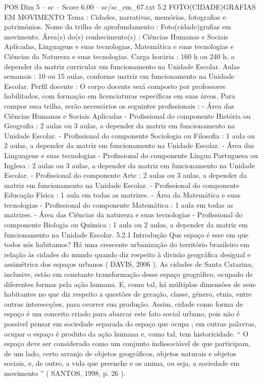 \begin{textsample}{POS Dim 5 – sc – Score 6.00 – sc/sc\_em\_67.txt}  \label{ex:f5_pos_035}
5.2 FOTO(CIDADE)GRAFIAS EM MOVIMENTO Tema : Cidades, narrativas, memórias, fotografias e patrimônios.
Nome da trilha de aprofundamento : Foto(cidade)grafias em movimento.
Área(s) do(s) conhecimento(s) : Ciências Humanas e Sociais Aplicadas, Linguagens e suas tecnologias, Matemática e suas tecnologias e Ciências da Natureza e suas tecnologias.
Carga horária : 160 h ou 240 h, a depender da matriz curricular em funcionamento na Unidade Escolar.
Aulas semanais : 10 ou 15 aulas, conforme matriz em funcionamento na Unidade Escolar.
Perfil docente : O corpo docente será composto por professores habilitados, com formação em licenciaturas específicas em suas áreas.
Para compor essa trilha, serão necessários os seguintes profissionais : - Área das Ciências Humanas e Sociais Aplicadas - Profissional do componente História ou Geografia : 2 aulas ou 3 aulas, a depender da matriz em funcionamento na Unidade Escolar. - Profissional do componente Sociologia ou Filosofia : 1 aula ou 2 aulas, a depender da matriz em funcionamento na Unidade Escolar. - Área das Linguagens e suas tecnologias - Profissional do componente Língua Portuguesa ou Inglesa : 2 aulas ou 3 aulas, a depender da matriz em funcionamento na Unidade Escolar. - Profissional do componente Arte : 2 aulas ou 3 aulas, a depender da matriz em funcionamento na Unidade Escolar. - Profissional do componente Educação Física : 1 aula em todas as matrizes. - Área da Matemática e suas tecnologias - Profissional do componente Matemática : 1 aula em todas as matrizes. - Área das Ciências da natureza e suas tecnologias - Profissional do componente Biologia ou Química : 1 aula ou 2 aulas, a depender da matriz em funcionamento na Unidade Escolar. 5.2.1 Introdução Que espaço é esse em que todos nós habitamos?
Há uma crescente urbanização do território brasileiro em relação às cidades do mundo quando diz respeito à divisão geográfica desigual e assimétrica dos espaços urbanos ( DAVIS, 2006 ).
As cidades de Santa Catarina, inclusive, estão em constante transformação desse espaço geográfico, ocupado de diferentes formas pela ação humana.
E, como tal, há múltiplas dimensões de seus habitantes no que diz respeito a questões de geração, classe, gênero, etnia, entre outras intersecções, para ocorrer sua produção.
Assim, cidade como forma de espaço é um conceito criado para abarcar este fato social urbano, pois não é possível pensar em sociedade separada do espaço que ocupa ; em outras palavras, ocupar o espaço é produto da ação humana e, como tal, tem historicidade. “ O espaço deve ser considerado como um conjunto indissociável de que participam, de um lado, certo arranjo de objetos geográficos, objetos naturais e objetos sociais, e, de outro, a vida que preenche e os anima, ou seja, a sociedade em movimento ” ( SANTOS, 1998, p. 26 ).

\end{textsample}
